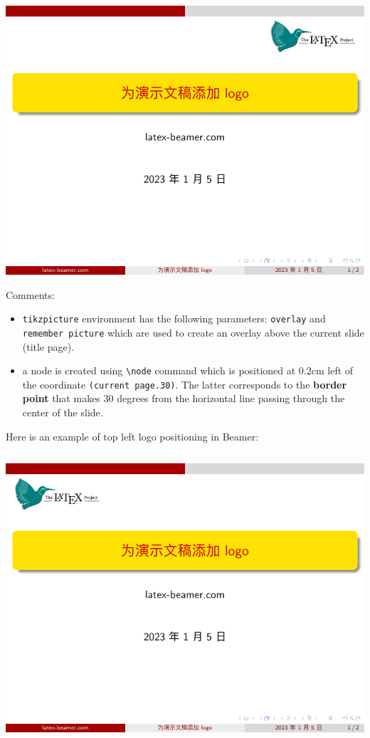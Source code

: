 \includegraphics[page=1]{examples/beamer/beamerlogo04.pdf}

Comments:

\begin{itemize}
  \item \verb|tikzpicture| environment has the following parameters: \verb|overlay| and \verb|remember picture| which are used to create an overlay above the current slide (title page).
  \item a node is created using \verb|\node| command which is positioned at 0.2cm left of the coordinate \verb|(current page.30)|. The latter corresponds to the {\bfseries border point} that makes 30 degrees from the horizontal line passing through the center of the slide.
\end{itemize}

Here is an example of top left logo positioning in Beamer:

\inputminted[linenos=true]{latex}{examples/beamer/beamerlogo05.tex}

\includegraphics[page=1]{examples/beamer/beamerlogo05.pdf}

